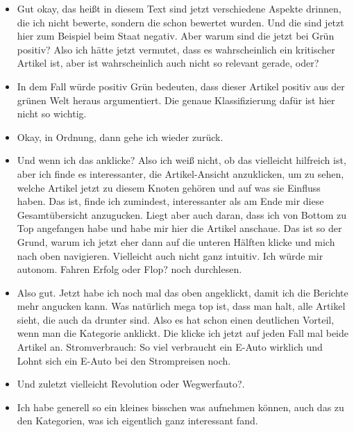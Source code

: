 {\begin{itemize}[]
                  Von daher hätte ich das jetzt einfach angeklickt, weil es halt am interessantesten klingt.
            \item {} Gut okay, das heißt in diesem Text sind jetzt verschiedene Aspekte drinnen, die ich nicht bewerte, sondern die schon bewertet wurden.
                  Und die sind jetzt hier zum Beispiel beim Staat negativ.
                  Aber warum sind die jetzt bei Grün positiv?
                  Also ich hätte jetzt vermutet, dass es wahrscheinlich ein kritischer Artikel ist, aber ist wahrscheinlich auch nicht so relevant gerade, oder?
            \item {} In dem Fall würde positiv Grün bedeuten, dass dieser Artikel positiv aus der grünen Welt heraus argumentiert.
                  Die genaue Klassifizierung dafür ist hier nicht so wichtig.
            \item {} Okay, in Ordnung, dann gehe ich wieder zurück.
            \item {} Und wenn ich das anklicke?
                  Also ich weiß nicht, ob das vielleicht hilfreich ist, aber ich finde es interessanter, die Artikel-Ansicht anzuklicken, um zu sehen, welche Artikel jetzt zu diesem Knoten gehören und auf was sie Einfluss haben.
                  Das ist, finde ich zumindest, interessanter als am Ende mir diese Gesamtübersicht anzugucken.
                  Liegt aber auch daran, dass ich von Bottom zu Top angefangen habe und habe mir hier die Artikel anschaue.
                  Das ist so der Grund, warum ich jetzt eher dann auf die unteren Hälften klicke und mich nach oben navigieren.
                  Vielleicht auch nicht ganz intuitiv.
                  Ich würde mir \flqq autonom. Fahren Erfolg oder Flop?\frqq{} noch durchlesen.
            \item {} Also gut. Jetzt habe ich noch mal das oben angeklickt, damit ich die Berichte mehr angucken kann.
                  Was natürlich mega top ist, dass man halt, alle Artikel sieht, die auch da drunter sind.
                  Also es hat schon einen deutlichen Vorteil, wenn man die Kategorie anklickt.
                  Die klicke ich jetzt auf jeden Fall mal beide Artikel an.
                  \flqq Stromverbrauch: So viel verbraucht ein E-Auto wirklich\frqq{} und \flqq Lohnt sich ein E-Auto bei den Strompreisen noch\frqq{}.
            \item {} Und zuletzt vielleicht \flqq Revolution oder Wegwerfauto?\frqq{}.
            \item {} Ich habe generell so ein kleines bisschen was aufnehmen können, auch das zu den Kategorien, was ich eigentlich ganz interessant fand.

\end{itemize}}
